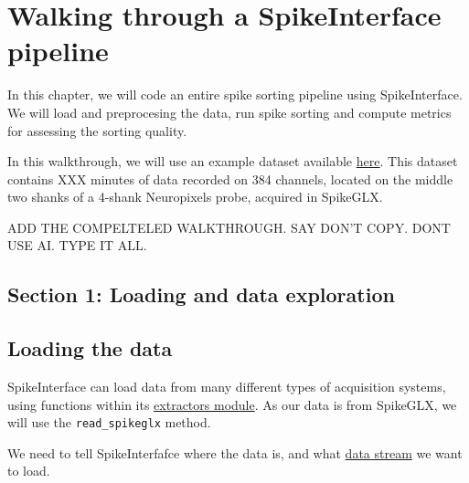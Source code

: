 \documentclass[
  letterpaper,
  DIV=11,
  numbers=noendperiod]{scrreprt}
\begin{document}

\chapter*{Walking through a SpikeInterface
pipeline}\label{walking-through-a-spikeinterface-pipeline}


\hfill\break
In this chapter, we will code an entire spike sorting pipeline using
SpikeInterface. We will load and preprocesing the data, run spike
sorting and compute metrics for assessing the sorting quality.

In this walkthrough, we will use an example dataset available
\href{}{here}. This dataset contains XXX minutes of data recorded on 384
channels, located on the middle two shanks of a 4-shank Neuropixels
probe, acquired in SpikeGLX.

ADD THE COMPELTELED WALKTHROUGH. SAY DON'T COPY. DONT USE AI. TYPE IT
ALL.

\section*{Section 1: Loading and data
exploration}\label{section-1-loading-and-data-exploration}


\section*{Loading the data}\label{loading-the-data}


SpikeInterface can load data from many different types of acquisition
systems, using functions within its
\href{https://spikeinterface.readthedocs.io/en/stable/modules/extractors.html}{extractors
module}. As our data is from SpikeGLX, we will use the
\texttt{read\_spikeglx} method.

We need to tell SpikeInterfafce where the data is, and what
\href{https://github.com/billkarsh/SpikeGLX/blob/master/Markdown/UserManual.md\#data-stream}{data
stream} we want to load.
\end{document}
